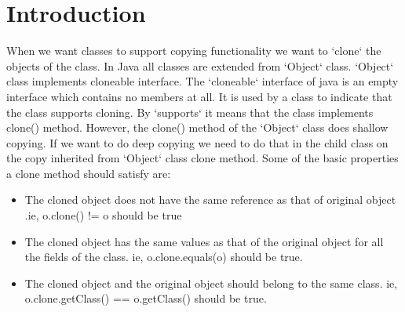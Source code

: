 \section{Introduction \label{introduction}}
 When we want classes to support copying functionality we want to `clone` the objects of the class. In Java all classes are extended from `Object` class. `Object` class implements cloneable interface. The `cloneable` interface of java is an empty interface which contains no members at all. It is used by a class to indicate that the class supports cloning. By `supports` it means that the class implements clone() method. However, the clone() method of the `Object` class does shallow copying. If we want to do deep copying we need to do that in the child class on the copy inherited from `Object` class clone method. Some of the basic properties a clone method should satisfy are: 
 \begin{itemize}
 	\item The cloned object does not have the same 		reference as that of original object .ie, o.clone() != o should be true
	\item The cloned object has the same values as that of the original object for all the fields of the class.
ie, o.clone.equals(o) should be true.
	\item The cloned object and the original object should belong to the same class.
ie, o.clone.getClass() == o.getClass() should be true. 
 \end{itemize}
 